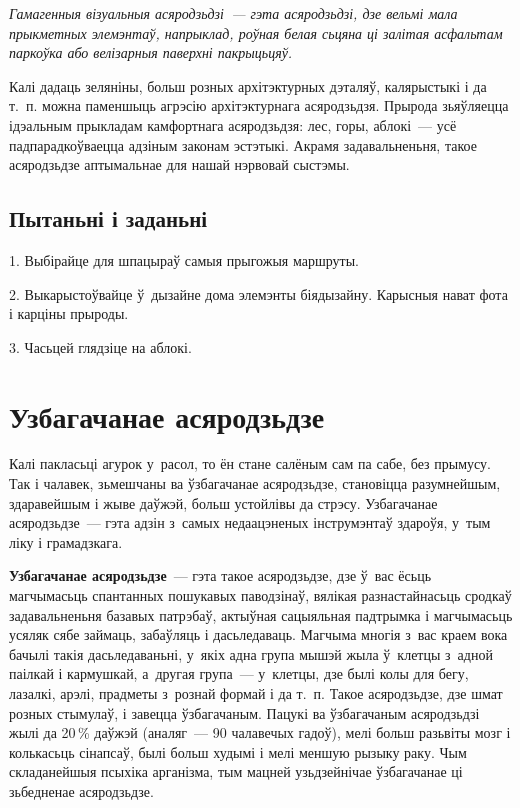 \emph{Гамагенныя візуальныя асяродзьдзі~--- гэта асяродзьдзі, дзе вельмі мала прыкметных элемэнтаў, напрыклад, роўная белая сьцяна ці залітая асфальтам паркоўка або велізарныя паверхні пакрыцьцяў.}

Калі дадаць зеляніны, больш розных архітэктурных дэталяў, калярыстыкі і да т.~п. можна паменшыць агрэсію архітэктурнага асяродзьдзя. Прырода зьяўляецца ідэальным прыкладам камфортнага асяродзьдзя: лес, горы, аблокі~--- усё падпарадкоўваецца адзіным законам эстэтыкі. Акрамя задавальненьня, такое асяродзьдзе аптымальнае для нашай нэрвовай сыстэмы.

\subsection*{Пытаньні і заданьні}

1. Выбірайце для шпацыраў самыя прыгожыя маршруты.

2. Выкарыстоўвайце ў~дызайне дома элемэнты біядызайну. Карысныя нават фота і карціны прыроды.

3. Часьцей глядзіце на аблокі.


\section{Узбагачанае асяродзьдзе}

Калі пакласьці агурок у~расол, то ён стане салёным сам па сабе, без прымусу. Так і чалавек, зьмешчаны ва ўзбагачанае асяродзьдзе, становіцца разумнейшым, здаравейшым і жыве даўжэй, больш устойлівы да стрэсу. Узбагачанае асяродзьдзе~--- гэта адзін з~самых недаацэненых інструмэнтаў здароўя, у~тым ліку і грамадзкага.

\textbf{Узбагачанае асяродзьдзе}~--- гэта такое асяродзьдзе, дзе ў~вас ёсьць магчымасьць спантанных пошукавых паводзінаў, вялікая разнастайнасьць сродкаў задавальненьня базавых патрэбаў, актыўная сацыяльная падтрымка і магчымасьць усяляк сябе займаць, забаўляць і дасьледаваць. Магчыма многія з~вас краем вока бачылі такія дасьледаваньні, у~якіх адна група мышэй жыла ў~клетцы з~адной паілкай і кармушкай, а~другая група~--- у~клетцы, дзе былі колы для бегу, лазалкі, арэлі, прадметы з~рознай формай і да т.~п. Такое асяродзьдзе, дзе шмат розных стымулаў, і завецца ўзбагачаным. Пацукі ва ўзбагачаным асяродзьдзі жылі да 20\,\% даўжэй (аналяг~--- 90 чалавечых гадоў), мелі больш разьвіты мозг і колькасьць сінапсаў, былі больш худымі і мелі меншую рызыку раку. Чым складанейшыя псыхіка арганізма, тым мацней узьдзейнічае ўзбагачанае ці зьбедненае асяродзьдзе.

